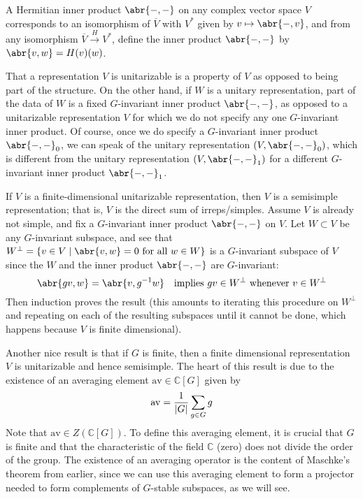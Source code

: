 \documentclass[11pt,leqno]{article}
\theoremstyle{plain}
\theoremstyle{definition}
\numberwithin{equation}{section}
\numberwithin{lem}{section}
\newcommand{\cbr}[1]{\left\{#1\right\}}
\newcommand{\av}{\mathrm{av}}
\begin{document}
A Hermitian inner product $\abr{-,-}$ on any complex vector space $V$ corresponds to an isomorphism of $\overline V$ with $V^\ast$ given by $v\mapsto \abr{-,v}$, and from any isomorphism $\overline V\xrightarrow{H} V^\ast$, define the inner product $\abr{-,-}$ by $\abr{v,w} = H(v)(w)$.

That a representation $V$ is unitarizable is a property of $V$ as opposed to being part of the structure. On the other hand, if $W$ is a unitary representation, part of the data of $W$ is a fixed $G$-invariant inner product $\abr{-,-}$, as opposed to a unitarizable representation $V$ for which we do not specify any one $G$-invariant inner product. Of course, once we do specify a $G$-invariant inner product $\abr{-,-}_0$, we can speak of the unitary representation $(V,\abr{-,-}_0)$, which is different from the unitary representation $(V,\abr{-,-}_1)$ for a different $G$-invariant inner product $\abr{-,-}_1$.

If $V$ is a finite-dimensional unitarizable representation, then $V$ is a semisimple representation; that is, $V$ is the direct sum of irreps/simples. Assume $V$ is already not simple, and fix a $G$-invariant inner product $\abr{-,-}$ on $V$. Let $W\subset V$ be any $G$-invariant subspace, and see that $W^\perp = \cbr{v\in V\mid \abr{v,w} = 0\text{ for all }w\in W}$ is a $G$-invariant subspace of $V$ since the $W$ and the inner product $\abr{-,-}$ are $G$-invariant:
\[\abr{gv,w} = \abr{v,g^{-1}w}\quad\text{implies $gv\in W^\perp$ whenever $v\in W^\perp$}\]
Then induction proves the result (this amounts to iterating this procedure on $W^\perp$ and repeating on each of the resulting subspaces until it cannot be done, which happens because $V$ is finite dimensional).

Another nice result is that if $G$ is finite, then a finite dimensional representation $V$ is unitarizable and hence semisimple. The heart of this result is due to the existence of an averaging element $\av\in\mathbb C[G]$ given by
\[\av = \frac{1}{\abs{G}}\sum_{g\in G}g\]
Note that $\av\in Z(\mathbb C[G])$. To define this averaging element, it is crucial that $G$ is finite and that the characteristic of the field $\mathbb C$ (zero) does not divide the order of the group. The existence of an averaging operator is the content of Maschke's theorem from earlier, since we can use this averaging element to form a projector needed to form complements of $G$-stable subspaces, as we will see. 
\end{document}

